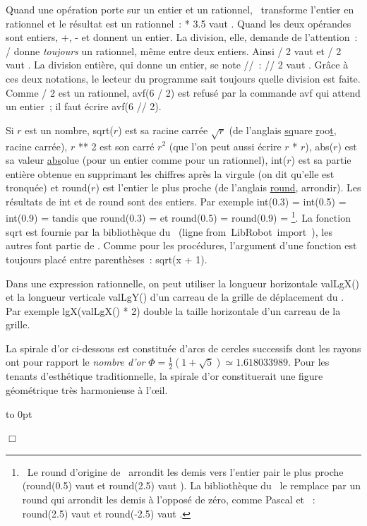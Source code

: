 Quand une opération porte sur un entier et un rationnel, \python\ transforme l'entier en
rationnel et le résultat est un rationnel~: { * 3.5} vaut {}.
Quand les deux opérandes sont entiers, {\idt +}, {\idt -} et {\idt *} donnent un entier.
La division, elle, demande de l'attention~: {\idt /} donne {\em toujours} un rationnel,
même entre deux entiers. Ainsi { / 2} vaut {} et { / 2} vaut {}.
La division entière, qui donne un entier, se note {\idt //}~: { // 2} vaut {}.
Grâce à ces deux notations, le lecteur du programme sait toujours quelle division est faite.
Comme { / 2} est un rationnel, {\idt avf(6 / 2)} est refusé par la commande {\idt avf}
qui attend un entier~; il faut écrire {\idt avf(6 // 2)}.

Si $r$ est un nombre, {\idt sqrt($r$)} est sa racine carrée $\sqrt{r}$ (de l'anglais
\underline{sq}uare \underline{r}oo\underline{t}, racine carrée),
{\idt $r$ ** 2} est son carré $r^{2}$ (que l'on peut aussi écrire {\idt $r$ * $r$}),
{\idt abs($r$)} est sa valeur \underline{abs}olue (pour un entier comme pour un rationnel),
{\idt int($r$)} est sa partie entière obtenue en supprimant les chiffres après la virgule
(on dit qu'elle est tronquée) et {\idt round($r$)} est l'entier le plus proche (de
l'anglais \underline{round}, arrondir). Les résultats de {\idt int} et de {\idt round}
sont des entiers. Par exemple
{\idt int(0.3)} = {\idt int(0.5)} = {\idt int(0.9)} = {} tandis que
{\idt round(0.3)} = {} et {\idt round(0.5)} = {\idt round(0.9)} = {}\footnote{\ Le
{\idt round} d'origine de \python\ arrondit les demis vers l'entier pair le plus proche
({\idt round(0.5)} vaut {} et {\idt round(2.5)} vaut {}). La bibliothèque du
\robot\ le remplace par un {\idt round} qui arrondit les demis à l'opposé de zéro, comme
Pascal et \ocaml~: {\idt round(2.5)} vaut {} et {\idt round(-2.5)} vaut {}.}.
La fonction {\idt sqrt} est fournie par la bibliothèque du \robot\ (ligne
{\mcl from}\ {\idt LibRobot}\ {\mcl import}\ {\idt *}), les autres font partie de \python.
Comme pour les procédures, l'argument d'une fonction est toujours placé entre
parenthèses~: {\idt sqrt(x + 1)}.

Dans une expression rationnelle, on peut utiliser la longueur horizontale {\idt valLgX()} et la
longueur verticale {\idt valLgY()} d'un carreau de la grille de déplacement du \robot. Par exemple
{\idt lgX(valLgX() * 2)} double la taille horizontale d'un carreau de la grille.

\begin{exemple}[Spirale d'or]{\rm
La spirale d'or ci-dessous est constituée d'arcs de cercles successifs dont les rayons
ont pour rapport le {\em nombre d'or\/}
$\Phi = \frac{1}{2}(1 + \sqrt{5}) \simeq 1.618033989$. Pour les tenants d'esthétique
traditionnelle, la spirale d'or constituerait une figure géométrique très harmonieuse
à l'œil.

{\raggedright
 \vbox to 0pt{}
 
 }
\noindent $\Box$ }\end{exemple}

